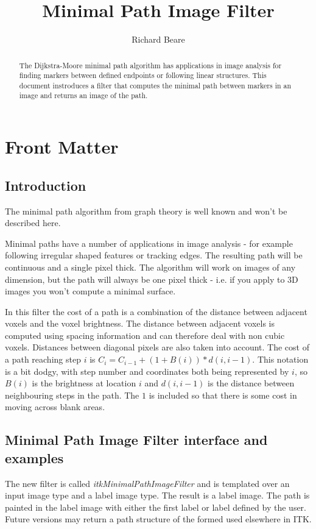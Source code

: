 \documentclass{InsightArticle}
\title{Minimal Path Image Filter}
\author{Richard Beare}
\begin{document}
\maketitle

\ifhtml
\chapter*{Front Matter\label{front}}
\fi


\begin{abstract}
\noindent
The Dijkstra-Moore minimal path algorithm has applications in image
analysis for finding markers between defined endpoints or following
linear structures. This document instroduces a filter that computes
the minimal path between markers in an image and returns an image of
the path.
\end{abstract}

\tableofcontents

\section{Introduction}
The minimal path algorithm from graph theory is well known and won't
be described here.

Minimal paths have a number of applications in image analysis - for
example following irregular shaped features or tracking edges. The
resulting path will be continuous and a single pixel thick. The
algorithm will work on images of any dimension, but the path will
always be one pixel thick - i.e. if you apply to 3D images you won't
compute a minimal surface.

In this filter the cost of a path is a combination of the distance
between adjacent voxels and the voxel brightness. The distance between
adjacent voxels is computed using spacing information and can
therefore deal with non cubic voxels. Distances between diagonal
pixels are also taken into account. The cost of a path reaching step
$i$ is $C_i = C_{i-1} + (1+ B(i)) * d(i,i-1)$. This notation is a bit
dodgy, with step number and coordinates both being represented by $i$,
so $B(i)$ is the brightness at location $i$ and $d(i, i-1)$ is the
distance between neighbouring steps in the path. The $1$ is included
so that there is some cost in moving across blank areas. 

\section{Minimal Path Image Filter interface and examples}
The new filter is called {\em itkMinimalPathImageFilter} and is
templated over an input image type and a label image type. The result
is a label image. The path is painted in the label image with either
the first label or label defined by the user. Future versions may
return a path structure of the formed used elsewhere in ITK. 
\end{document}
